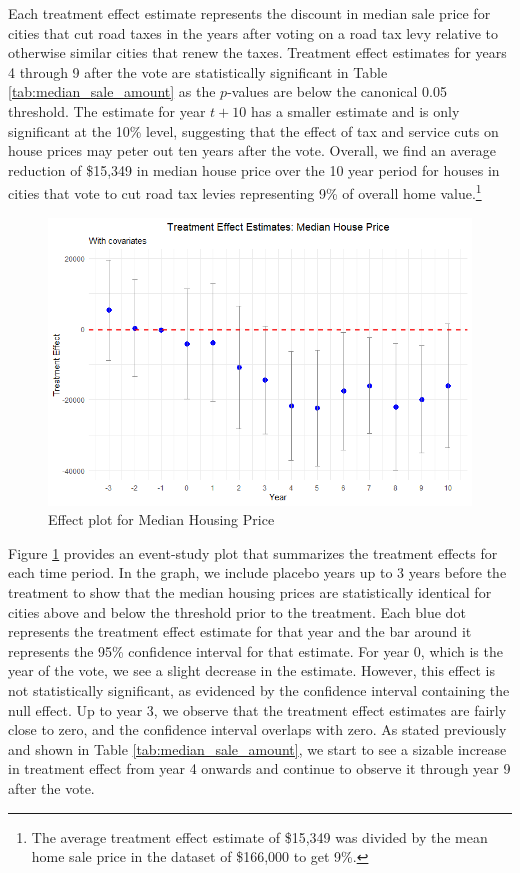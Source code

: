 Each treatment effect estimate represents the discount in median sale price for cities that cut road taxes in the years after voting on a road tax levy relative to otherwise similar cities that renew the taxes. Treatment effect estimates for years 4 through 9 after the vote are statistically significant in Table \ref{tab:median_sale_amount} as the $p$-values are below the canonical 0.05 threshold. The estimate for year $t + 10$ has a smaller estimate and is only significant at the 10\% level, suggesting that the effect of tax and service cuts on house prices may peter out ten years after the vote. Overall, we find an average reduction of \$15,349 in median house price over the 10 year period for houses in cities that vote to cut road tax levies representing 9\% of overall home value.\footnote{The average treatment effect estimate of \$15,349 was divided by the mean home sale price in the dataset of \$166,000 to get 9\%.}

\begin{figure}[htbp]
    \centering
    \includegraphics[width=\textwidth,keepaspectratio]{images/tes_gs_reg.png}    
    \caption{Effect plot for Median Housing Price}
    \label{fig:tes_hp}
\end{figure}

Figure \ref{fig:tes_hp} provides an event-study plot that summarizes the treatment effects for each time period. In the graph, we include placebo years up to 3 years before the treatment to show that the median housing prices are statistically identical for cities above and below the threshold prior to the treatment. Each blue dot represents the treatment effect estimate for that year and the bar around it represents the 95\% confidence interval for that estimate. For year 0, which is the year of the vote, we see a slight decrease in the estimate. However, this effect is not statistically significant, as evidenced by the confidence interval containing the null effect. Up to year 3, we observe that the treatment effect estimates are fairly close to zero, and the confidence interval overlaps with zero. As stated previously and shown in Table \ref{tab:median_sale_amount}, we start to see a sizable increase in treatment effect from year 4 onwards and continue to observe it through year 9 after the vote. 
 
